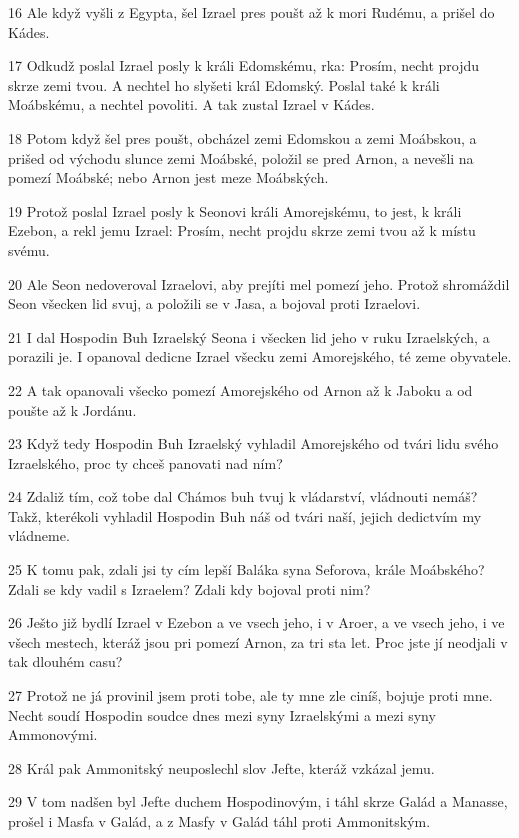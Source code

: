 \par 16 Ale když vyšli z Egypta, šel Izrael pres poušt až k mori Rudému, a prišel do Kádes.
\par 17 Odkudž poslal Izrael posly k králi Edomskému, rka: Prosím, necht projdu skrze zemi tvou. A nechtel ho slyšeti král Edomský. Poslal také k králi Moábskému, a nechtel povoliti. A tak zustal Izrael v Kádes.
\par 18 Potom když šel pres poušt, obcházel zemi Edomskou a zemi Moábskou, a prišed od východu slunce zemi Moábské, položil se pred Arnon, a nevešli na pomezí Moábské; nebo Arnon jest meze Moábských.
\par 19 Protož poslal Izrael posly k Seonovi králi Amorejskému, to jest, k králi Ezebon, a rekl jemu Izrael: Prosím, necht projdu skrze zemi tvou až k místu svému.
\par 20 Ale Seon nedoveroval Izraelovi, aby prejíti mel pomezí jeho. Protož shromáždil Seon všecken lid svuj, a položili se v Jasa, a bojoval proti Izraelovi.
\par 21 I dal Hospodin Buh Izraelský Seona i všecken lid jeho v ruku Izraelských, a porazili je. I opanoval dedicne Izrael všecku zemi Amorejského, té zeme obyvatele.
\par 22 A tak opanovali všecko pomezí Amorejského od Arnon až k Jaboku a od poušte až k Jordánu.
\par 23 Když tedy Hospodin Buh Izraelský vyhladil Amorejského od tvári lidu svého Izraelského, proc ty chceš panovati nad ním?
\par 24 Zdaliž tím, což tobe dal Chámos buh tvuj k vládarství, vládnouti nemáš? Takž, kterékoli vyhladil Hospodin Buh náš od tvári naší, jejich dedictvím my vládneme.
\par 25 K tomu pak, zdali jsi ty cím lepší Baláka syna Seforova, krále Moábského? Zdali se kdy vadil s Izraelem? Zdali kdy bojoval proti nim?
\par 26 Ješto již bydlí Izrael v Ezebon a ve vsech jeho, i v Aroer, a ve vsech jeho, i ve všech mestech, kteráž jsou pri pomezí Arnon, za tri sta let. Proc jste jí neodjali v tak dlouhém casu?
\par 27 Protož ne já provinil jsem proti tobe, ale ty mne zle ciníš, bojuje proti mne. Necht soudí Hospodin soudce dnes mezi syny Izraelskými a mezi syny Ammonovými.
\par 28 Král pak Ammonitský neuposlechl slov Jefte, kteráž vzkázal jemu.
\par 29 V tom nadšen byl Jefte duchem Hospodinovým, i táhl skrze Galád a Manasse, prošel i Masfa v Galád, a z Masfy v Galád táhl proti Ammonitským.
